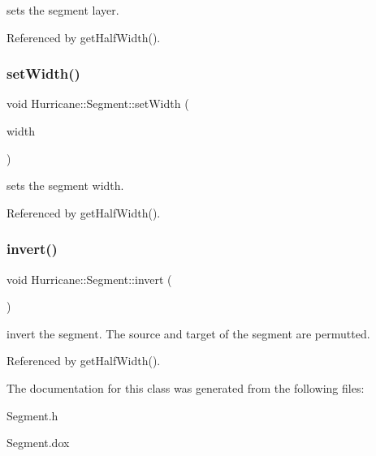 sets the segment layer. 

Referenced by get\+Half\+Width().

\mbox{\label{classHurricane_1_1Segment_aec203d5d3aa96150979ba532d4bd1c7d}} 
\subsubsection{\texorpdfstring{set\+Width()}{setWidth()}}
{\footnotesize\ttfamily void Hurricane\+::\+Segment\+::set\+Width (\begin{DoxyParamCaption}\item[{const \hyperlink{group__DbUGroup_ga4fbfa3e8c89347af76c9628ea06c4146}{Db\+U\+::\+Unit} \&}]{width }\end{DoxyParamCaption})}

sets the segment width. 

Referenced by get\+Half\+Width().

\mbox{\label{classHurricane_1_1Segment_aceaa61242eb7275cf9c6a39cf1868c53}} 
\subsubsection{\texorpdfstring{invert()}{invert()}}
{\footnotesize\ttfamily void Hurricane\+::\+Segment\+::invert (\begin{DoxyParamCaption}{ }\end{DoxyParamCaption})}

invert the segment. The source and target of the segment are permutted. 

Referenced by get\+Half\+Width().



The documentation for this class was generated from the following files\+:\begin{DoxyCompactItemize}
\item 
Segment.\+h\item 
Segment.\+dox\end{DoxyCompactItemize}
